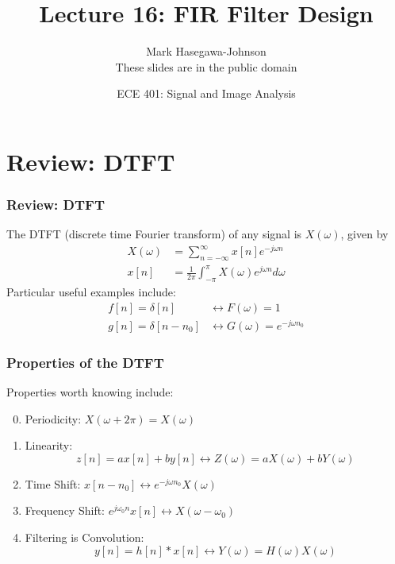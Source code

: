\documentclass{beamer}
\title{Lecture 16: FIR Filter Design}
\author{Mark Hasegawa-Johnson\\These slides are in the public domain}
\date{ECE 401: Signal and Image Analysis}
\begin{document}
\begin{frame}
  \maketitle
\end{frame}

\begin{frame}
  \tableofcontents
\end{frame}

\section[DTFT]{Review: DTFT}
\setcounter{subsection}{1}

\begin{frame}
  \frametitle{Review: DTFT}

  The DTFT (discrete time Fourier transform) of any signal is
  $X(\omega)$, given by
  \begin{align*}
    X(\omega) &= \sum_{n=-\infty}^\infty x[n]e^{-j\omega n}\\
    x[n] &= \frac{1}{2\pi}\int_{-\pi}^\pi X(\omega)e^{j\omega n}d\omega
  \end{align*}
  Particular useful examples include:
  \begin{align*}
    f[n]=\delta[n] &\leftrightarrow F(\omega)=1\\
    g[n]=\delta[n-n_0] &\leftrightarrow G(\omega)=e^{-j\omega n_0}
  \end{align*}
\end{frame}

\begin{frame}
  \frametitle{Properties of the DTFT}

  Properties worth knowing  include:
  \begin{enumerate}
    \setcounter{enumi}{-1}
  \item Periodicity: $X(\omega+2\pi)=X(\omega)$
  \item Linearity:
    \[z[n]=ax[n]+by[n]\leftrightarrow Z(\omega)=aX(\omega)+bY(\omega)
    \]
  \item Time Shift: $x[n-n_0]\leftrightarrow e^{-j\omega n_0}X(\omega)$
  \item Frequency Shift: $e^{j\omega_0 n}x[n]\leftrightarrow X(\omega-\omega_0)$
  \item Filtering is Convolution:
    \[
    y[n]=h[n]\ast x[n]\leftrightarrow Y(\omega)=H(\omega)X(\omega)
    \]
  \end{enumerate}
\end{frame}
\end{document}
